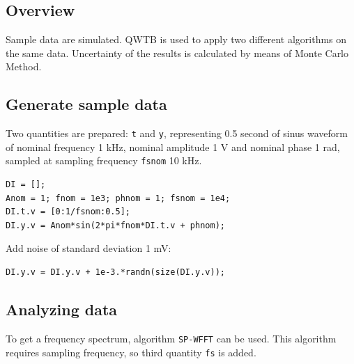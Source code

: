 \startcontents[localtoc]



{}
\subsection*{Overview}



Sample data are simulated. QWTB is used to apply two different algorithms on the
same data. Uncertainty of the results is calculated by means of Monte Carlo
Method.



{}
\subsection*{Generate sample data}



Two quantities are prepared: \texttt{t} and \texttt{y}, representing 0.5 second of sinus
waveform of nominal frequency 1 kHz, nominal amplitude 1 V and nominal phase
1 rad, sampled at sampling frequency \texttt{fsnom} 10 kHz.

\begin{lstlisting}
DI = [];
Anom = 1; fnom = 1e3; phnom = 1; fsnom = 1e4;
DI.t.v = [0:1/fsnom:0.5];
DI.y.v = Anom*sin(2*pi*fnom*DI.t.v + phnom);
\end{lstlisting}


Add noise of standard deviation 1 mV:

\begin{lstlisting}
DI.y.v = DI.y.v + 1e-3.*randn(size(DI.y.v));
\end{lstlisting}


{}
\subsection*{Analyzing data}



To get a frequency spectrum, algorithm \texttt{SP-WFFT} can be used. This algorithm
requires sampling frequency, so third quantity \texttt{fs} is added.

